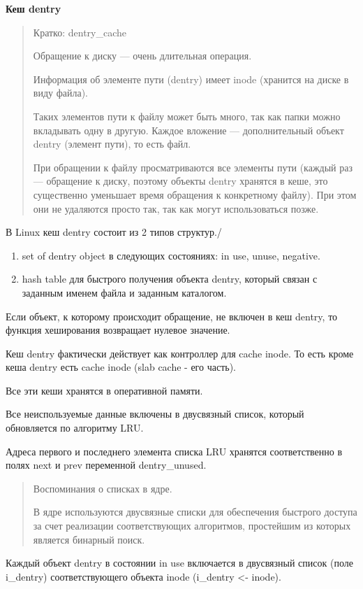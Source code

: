 \textbf{Кеш dentry}

\begin{quote}
Кратко:
dentry\_cache

Обращение к диску — очень длительная операция. 

Информация об элементе пути (dentry) имеет inode (хранится на диске в виду файла).

Таких элементов пути к файлу может быть много, так как папки можно вкладывать одну в другую. Каждое вложение — дополнительный объект dentry (элемент пути), то есть файл.

При обращении к файлу просматриваются все элементы пути (каждый раз — обращение к диску, поэтому объекты dentry хранятся в кеше, это существенно уменьшает время обращения к конкретному файлу). При этом они не удаляются просто так, так как могут использоваться позже.
\end{quote}

В Linux кеш dentry состоит из 2 типов структур./
\begin{enumerate}
\item set of dentry object в следующих состояниях: in use, unuse, negative.
\item hash table для быстрого получения объекта dentry, который связан с заданным именем файла и заданным каталогом.
\end{enumerate}

Если объект, к которому происходит обращение, не включен в кеш dentry, то функция хеширования возвращает нулевое значение.

Кеш dentry фактически действует как контроллер для cache inode. То есть кроме кеша dentry есть cache inode (slab cache - его часть).

Все эти кеши хранятся в оперативной памяти.

Все неиспользуемые данные включены в двусвязный список, который обновляется по алгоритму LRU.

Адреса первого и последнего элемента списка LRU хранятся соответственно в полях next и prev переменной dentry\_unused.

\begin{quote}
Воспоминания о списках в ядре.

В ядре используются двусвязные списки для обеспечения быстрого доступа за счет реализации соответствующих алгоритмов, простейшим из которых является бинарный поиск.
\end{quote}

Каждый объект dentry в состоянии in use включается в двусвязный список (поле i\_dentry) соответствующего объекта inode (i\_dentry <- inode).

